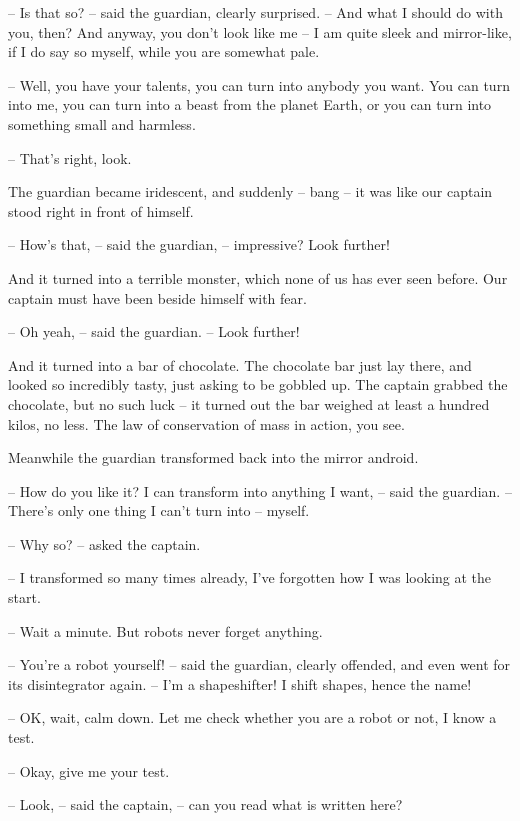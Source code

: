 \documentclass[ebook,oneside,final,openright]{memoir}
\begin{document}
– Is that so? – said the guardian, clearly surprised. – And what I should do with you, then? And anyway, you don’t look like me – I am quite sleek and mirror-like, if I do say so myself, while you are somewhat pale.\par
– Well, you have your talents, you can turn into anybody you want. You can turn into me, you can turn into a beast from the planet Earth, or you can turn into something small and harmless.\par
– That’s right, look.\par
\par
The guardian became iridescent, and suddenly – bang – it was like our captain stood right in front of himself.\par
– How’s that, – said the guardian, – impressive? Look further!\par
And it turned into a terrible monster, which none of us has ever seen before. Our captain must have been beside himself with fear.\par
– Oh yeah, – said the guardian. – Look further!\par
\par
And it turned into a bar of chocolate. The chocolate bar just lay there, and looked so incredibly tasty, just asking to be gobbled up. The captain grabbed the chocolate, but no such luck – it turned out the bar weighed at least a hundred kilos, no less. The law of conservation of mass in action, you see.\par
\par
Meanwhile the guardian transformed back into the mirror android.\par
– How do you like it? I can transform into anything I want, – said the guardian. – There’s only one thing I can’t turn into – myself.\par
– Why so? – asked the captain.\par
– I transformed so many times already, I’ve forgotten how I was looking at the start.\par
– Wait a minute. But robots never forget anything.\par
– You’re a robot yourself! – said the guardian, clearly offended, and even went for its disintegrator again. – I’m a shapeshifter! I shift shapes, hence the name!\par
– OK, wait, calm down. Let me check whether you are a robot or not, I know a test.\par
– Okay, give me your test.\par
– Look, – said the captain, – can you read what is written here?\par
\end{document}
